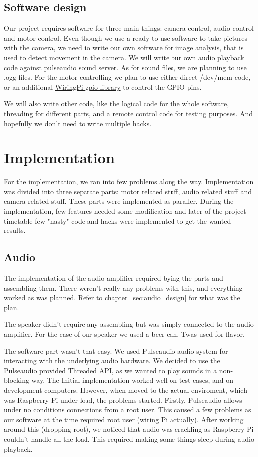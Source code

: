 \documentclass[english,11pt,twoside,a4paper]{article}
\begin{document}
\subsection{Software design}

Our project requires software for three main things: camera control, audio control and motor control. Even though we use a ready-to-use software to take pictures with the camera, we need to write our own software for image analysis, that is used to detect movement in the camera. We will write our own audio playback code against pulseaudio sound server. As for sound files, we are planning to use .ogg files. For the motor controlling we plan to use either direct /dev/mem code, or an additional \href{http://wiringpi.com}{WiringPi gpio library} to control the GPIO pins.

We will also write other code, like the logical code for the whole software, threading for different parts, and a remote control code for testing purposes. And hopefully we don't need to write multiple hacks.

\section{Implementation}

For the implementation, we ran into few problems along the way. Implementation was divided into three separate parts: motor related stuff, audio related stuff and camera related stuff. These parts were implemented as paraller. During the implementation, few features needed some modification and later of the project timetable few "nasty" code and hacks were implemented to get the wanted results.

\subsection{Audio}

The implementation of the audio amplifier required bying the parts and assembling them. There weren't really any problems with this, and everything worked as was planned. Refer to chapter~\ref{sec:audio_design} for what was the plan.

The speaker didn't require any assembling but was simply connected to the audio amplifier. For the case of our speaker we used a beer can. Twas used for flavor.

The software part wasn't that easy. We used Pulseaudio audio system for interacting with the underlying audio hardware. We decided to use the Pulseaudio provided Threaded API, as we wanted to play sounds in a non-blocking way. The Initial implementation worked well on test cases, and on development computers. However, when moved to the actual enviroment, which was Raspberry Pi under load, the problems started. Firstly, Pulseaudio allows under no conditions connections from a root user. This caused a few problems as our software at the time required root user (wiring Pi actually). After working around this (dropping root), we noticed that audio was crackling as Raspberry Pi couldn't handle all the load. This required making some things sleep during audio playback.
\end{document}
